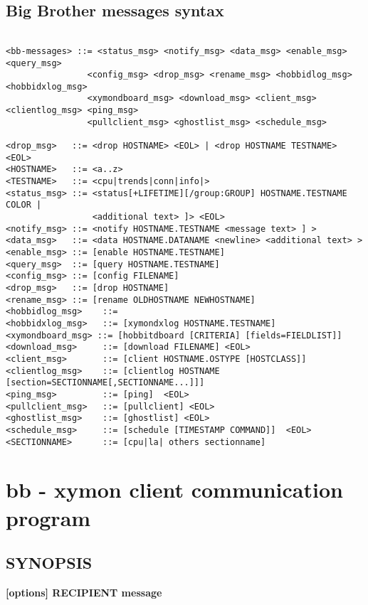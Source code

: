 \subsection{Big Brother messages syntax}

\begin{verbatim}

<bb-messages> ::= <status_msg> <notify_msg> <data_msg> <enable_msg> <query_msg> 
                <config_msg> <drop_msg> <rename_msg> <hobbidlog_msg> <hobbidxlog_msg> 
                <xymondboard_msg> <download_msg> <client_msg> <clientlog_msg> <ping_msg> 
                <pullclient_msg> <ghostlist_msg> <schedule_msg>

<drop_msg>   ::= <drop HOSTNAME> <EOL> | <drop HOSTNAME TESTNAME> <EOL>
<HOSTNAME>   ::= <a..z> 
<TESTNAME>   ::= <cpu|trends|conn|info|> 
<status_msg> ::= <status[+LIFETIME][/group:GROUP] HOSTNAME.TESTNAME COLOR |
                 <additional text> ]> <EOL>
<notify_msg> ::= <notify HOSTNAME.TESTNAME <message text> ] >
<data_msg>   ::= <data HOSTNAME.DATANAME <newline> <additional text> >
<enable_msg> ::= [enable HOSTNAME.TESTNAME]
<query_msg>  ::= [query HOSTNAME.TESTNAME]
<config_msg> ::= [config FILENAME]
<drop_msg>   ::= [drop HOSTNAME]
<rename_msg> ::= [rename OLDHOSTNAME NEWHOSTNAME]
<hobbidlog_msg>    ::= 
<hobbidxlog_msg>   ::= [xymondxlog HOSTNAME.TESTNAME]
<xymondboard_msg> ::= [hobbitdboard [CRITERIA] [fields=FIELDLIST]]
<download_msg>     ::= [download FILENAME] <EOL>
<client_msg>       ::= [client HOSTNAME.OSTYPE [HOSTCLASS]]
<clientlog_msg>    ::= [clientlog HOSTNAME [section=SECTIONNAME[,SECTIONNAME...]]]
<ping_msg>         ::= [ping]  <EOL>
<pullclient_msg>   ::= [pullclient] <EOL>
<ghostlist_msg>    ::= [ghostlist] <EOL>
<schedule_msg>     ::= [schedule [TIMESTAMP COMMAND]]  <EOL>
<SECTIONNAME>      ::= [cpu|la| others sectionname]

\end{verbatim}

%
\newpage
\section{bb - xymon client communication program}

\subsection{SYNOPSIS}
\textbf{ [options] RECIPIENT message}

